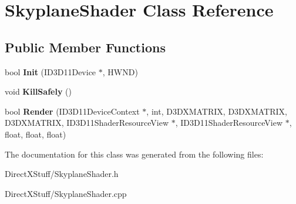 \hypertarget{class_skyplane_shader}{\section{Skyplane\-Shader Class Reference}
\label{class_skyplane_shader}
}
\subsection*{Public Member Functions}
\begin{DoxyCompactItemize}
\item 
\hypertarget{class_skyplane_shader_afb93e064f6462f086136a42e95ea03d2}{bool {\bfseries Init} (I\-D3\-D11\-Device $\ast$, H\-W\-N\-D)}\label{class_skyplane_shader_afb93e064f6462f086136a42e95ea03d2}

\item 
\hypertarget{class_skyplane_shader_a9061cd9c9d87f7ff06ff278cbd262c6c}{void {\bfseries Kill\-Safely} ()}\label{class_skyplane_shader_a9061cd9c9d87f7ff06ff278cbd262c6c}

\item 
\hypertarget{class_skyplane_shader_a14c48b80b382d76d5c8ceb87c075c254}{bool {\bfseries Render} (I\-D3\-D11\-Device\-Context $\ast$, int, D3\-D\-X\-M\-A\-T\-R\-I\-X, D3\-D\-X\-M\-A\-T\-R\-I\-X, D3\-D\-X\-M\-A\-T\-R\-I\-X, I\-D3\-D11\-Shader\-Resource\-View $\ast$, I\-D3\-D11\-Shader\-Resource\-View $\ast$, float, float, float)}\label{class_skyplane_shader_a14c48b80b382d76d5c8ceb87c075c254}

\end{DoxyCompactItemize}


The documentation for this class was generated from the following files\-:\begin{DoxyCompactItemize}
\item 
Direct\-X\-Stuff/Skyplane\-Shader.\-h\item 
Direct\-X\-Stuff/Skyplane\-Shader.\-cpp\end{DoxyCompactItemize}
